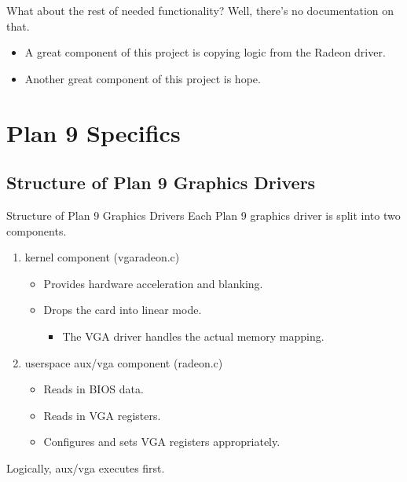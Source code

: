 \documentclass[xcolor=dvipsnames]{beamer}
\begin{document}
\begin{frame}[t]{What about the rest of needed functionality?}
	Well, there's no documentation on that.
	\begin{itemize}
		\item A great component of this project is copying logic from the Radeon driver.
		\item Another great component of this project is hope.
	\end{itemize}
\end{frame}



\section{Plan 9 Specifics}

\subsection{Structure of Plan 9 Graphics Drivers}

\begin{frame}[t]{Structure of Plan 9 Graphics Drivers}
	Each Plan 9  graphics driver is split into two components.
	
	\begin{enumerate}
		\pause
		\item kernel component (vgaradeon.c)
		\begin{itemize}
			\item Provides hardware acceleration and blanking.
			\item Drops the card into linear mode.
			\begin{itemize}
				\item The VGA driver handles the actual memory mapping.
			\end{itemize}
		\end{itemize}


		\pause
		\item userspace aux/vga component (radeon.c)
		\begin{itemize}
			\item Reads in BIOS data.
			\item Reads in VGA registers.
			\item Configures and sets VGA registers appropriately.
		\end{itemize}
	\end{enumerate}

	\pause
	Logically, aux/vga executes first.
\end{frame}
\end{document}
